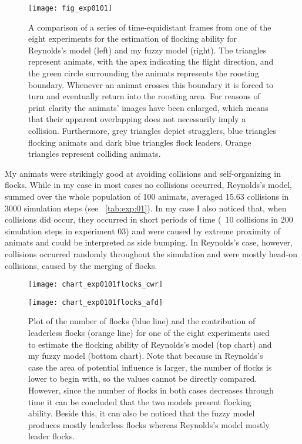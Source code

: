 \begin{figure}[p]
  \null\vspace*{1mm}
  \texttt{[image: fig\_exp0101]}
  \par\vspace*{1mm}
  \caption{A comparison of a series of time-equidistant frames from one of the eight experiments for the estimation of flocking ability for Reynolds's model \cite{reynolds:1999} (left) and my fuzzy model (right). The triangles represent animats, with the apex indicating the flight direction, and the green circle surrounding the animats represents the roosting boundary. Whenever an animat crosses this boundary it is forced to turn and eventually return into the roosting area. For reasons of print clarity the animats' images have been enlarged, which means that their apparent overlapping does not necessarily imply a collision. Furthermore, grey triangles depict stragglers, blue triangles flocking animats and dark blue triangles flock leaders. Orange triangles represent colliding animats.}
  \label{fig:exp:01:01}
\end{figure}
\afterpage{\clearpage}

My animats were strikingly good at avoiding collisions and self-organizing in flocks. While in my case in most cases no collisions occurred, Reynolds's model, summed over the whole population of 100 animats, averaged 15.63 collisions in 3000 simulation steps (see \tab~\ref{tab:exp:01}). In my case I also noticed that, when collisions did occur, they occurred in short periods of time (\eg\ 10 collisions in 200 simulation steps in experiment 03) and were caused by extreme proximity of animats and could be interpreted as side bumping. In Reynolds's case, however, collisions occurred randomly throughout the simulation and were mostly head-on collisions, caused by the merging of flocks.

\begin{figure*}[!t]
  \null\vspace*{2mm}
  \texttt{[image: chart\_exp0101flocks\_cwr]}
  \par\vspace*{2mm}
  \texttt{[image: chart\_exp0101flocks\_afd]}
  \par\vspace*{2mm}
  \caption{Plot of the number of flocks (blue line) and the contribution of leaderless flocks (orange line) for one of the eight experiments used to estimate the flocking ability of Reynolds's model \cite{reynolds:1999} (top chart) and my fuzzy model (bottom chart). Note that because in Reynolds's case the area of potential influence is larger, the number of flocks is lower to begin with, so the values cannot be directly compared. However, since the number of flocks in both cases decreases through time it can be concluded that the two models present flocking ability. Beside this, it can also be noticed that the fuzzy model produces mostly leaderless flocks whereas Reynolds's model mostly leader flocks.}
  \label{chart:exp:01:01:flocks}
\end{figure*}

